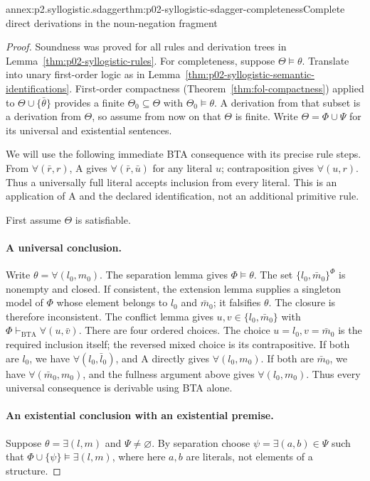 \begin{annexitem}{annex:p2.syllogistic.sdagger}{thm:p02-syllogistic-sdagger-completeness}{Complete direct derivations in the noun-negation fragment}
\begin{proof}
Soundness was proved for all rules and derivation trees in
Lemma~\ref{thm:p02-syllogistic-rules}. For completeness, suppose
\(\Theta\models\theta\). Translate into unary first-order logic as in
Lemma~\ref{thm:p02-syllogistic-semantic-identifications}. First-order
compactness (Theorem~\ref{thm:fol-compactness}) applied to
\(\Theta\cup\{\bar\theta\}\) provides a finite
\(\Theta_0\subseteq\Theta\) with \(\Theta_0\models\theta\).
A derivation from that subset is a derivation from \(\Theta\), so assume
from now on that \(\Theta\) is finite. Write
\(\Theta=\Phi\cup\Psi\) for its universal and existential sentences.

We will use the following immediate BTA consequence with its precise rule
steps. From \(\forall(\bar r,r)\), A gives
\(\forall(\bar r,\bar u)\) for any literal \(u\); contraposition gives
\(\forall(u,r)\). Thus a universally full literal accepts inclusion from
every literal. This is an application of A and the declared identification,
not an additional primitive rule.

First assume \(\Theta\) is satisfiable.

\paragraph{A universal conclusion.}
Write \(\theta=\forall(l_0,m_0)\). The separation lemma gives
\(\Phi\models\theta\). The set
\(\{l_0,\bar m_0\}^\Phi\) is nonempty and closed. If consistent,
the extension lemma supplies a singleton model of \(\Phi\) whose element
belongs to \(l_0\) and \(\bar m_0\); it falsifies \(\theta\).
The closure is therefore inconsistent. The conflict lemma gives
\(u,v\in\{l_0,\bar m_0\}\) with
\(\Phi\vdash_{\mathrm{BTA}}\forall(u,\bar v)\).
There are four ordered choices. The choice \(u=l_0,v=\bar m_0\) is the
required inclusion itself; the reversed mixed choice is its contrapositive.
If both are \(l_0\), we have \(\forall(l_0,\bar l_0)\), and A directly
gives \(\forall(l_0,m_0)\). If both are \(\bar m_0\), we have
\(\forall(\bar m_0,m_0)\), and the fullness argument above gives
\(\forall(l_0,m_0)\). Thus every universal consequence is derivable using
BTA alone.

\paragraph{An existential conclusion with an existential premise.}
Suppose \(\theta=\exists(l,m)\) and \(\Psi\ne\varnothing\).
By separation choose \(\psi=\exists(a,b)\in\Psi\) such that
\(\Phi\cup\{\psi\}\models\exists(l,m)\), where here \(a,b\)
are literals, not elements of a structure.


\end{proof}
\end{annexitem}

